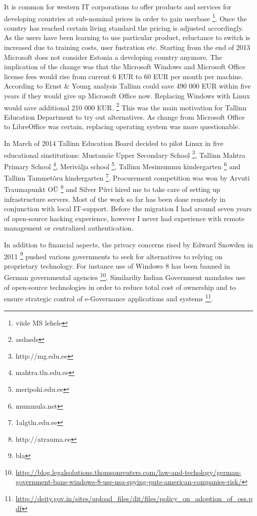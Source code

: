 \documentclass{article}
\begin{document}
It is common for western IT corporations to offer products
and services for developing countries at sub-nominal prices in order
to gain userbase
\footnote {viide MS lehele}.
Once the country has reached certain living standard the
pricing is adjusted accordingly.
As the users have been learning to use particular product,
reluctance to switch is increased due to training costs,
user fustration etc. 
Starting from the end of 2013 Microsoft does not consider Estonia a
developing country anymore. The implication of the change was that
the Microsoft Windows and Microsoft Office license fees would rise
from current 6 EUR to 60 EUR per month per machine.
According to Ernst \& Young analysis Tallinn could save 490 000 EUR
within five years if they would give up Microsoft Office now.
Replacing Windows with Linux would save additional 210 000 EUR.
\footnote{asdasds}
This was the main motivation for Tallinn Education Department to try
out alternatives. As change from Microsoft Office to LibreOffice was
certain, replacing operating system was more questionable.

In March of 2014 Tallinn Education Board decided
to pilot Linux in five educational sinstitutions:
Mustamäe Upper Secondary School
\footnote{http://mg.edu.ee},
Tallinn Mahtra Primary School
\footnote{mahtra.tln.edu.ee},
Merivälja school
\footnote{meripohi.edu.ee},
Tallinn Mesimummu kindergarten
\footnote{mummula.net} and
Tallinn Tammetõru kindergarten
\footnote{1algtln.edu.ee}.
Procurement competition was won by Arvuti Traumapunkt OÜ
\footnote{http://atrauma.ee} and
Silver Püvi hired me to take care of setting up infrastructure servers.
Most of the work so far has been done remotely in conjunction with
local IT-support. Before the migration I had around seven years of
open-source hacking experience, however I never had experience with
remote management or centralized authentication.

In addition to financial aspects, the privacy concerns rised by
Edward Snowden in 2011
\footnote{bla}
pushed various governments to seek for alternatives
to relying on proprietary technology.
For instance use of Windows 8 has been banned in German governmental agencies
\footnote{\url{http://blog.legalsolutions.thomsonreuters.com/law-and-techology/german-government-bans-windows-8-use-nsa-spying-puts-american-companies-risk/}}.
Similariliy Indian Government mandates use of open-source technologies
in order to reduce total cost of ownership and to ensure
strategic control of e-Governance applications and systems
\footnote{\url{http://deity.gov.in/sites/upload_files/dit/files/policy_on_adoption_of_oss.pdf}}.
\end{document}
